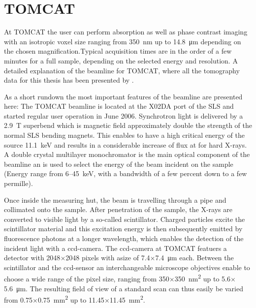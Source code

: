 \section{TOMCAT}
At \acf{TOMCAT} the user can perform absorption as well as phase contrast imaging with an isotropic voxel size ranging from \SI{350}{\nano\meter} up to \SI{14.8}{\micro\meter} depending on the chosen magnification.Typical acquisition times are in the order of a few minutes for a full sample, depending on the selected energy and resolution. A detailed explanation of the beamline for \ac{TOMCAT}, where all the tomography data for this thesis has been presented by \citet{Stampanoni2006a}.

As a short rundown the most important features of the beamline are presented here: The \ac{TOMCAT} beamline is located at the X02DA port of the SLS and started regular user operation in June 2006. Synchrotron light is delivered by a \SI{2.9}{\tesla} superbend which is magnetic field approximately double the strength of the normal \ac{SLS} bending magnets. This enables to have a high critical energy of the source \SI{11.1}{\kilo\electronvolt} and results in a considerable increase of flux at for hard X-rays. A double crystal multilayer monochromator is the main optical component of the beamline an is used to select the energy of the beam incident on the sample (Energy range from 6--\SI{45}{\kilo\electronvolt}, with a bandwidth of a few percent down to a few permille).

Once inside the measuring hut, the beam is travelling through a pipe and collimated onto the sample. After penetration of the sample, the X-rays are converted to visible light by a so-called scintillator. Charged particles excite the scintillator material and this excitation energy is then subsequently emitted by fluorescence photons at a longer wavelength, which enables the detection of the incident light with a \ac{ccd}-camera. The \ac{ccd}-camera at \ac{TOMCAT} featuers a detector with 2048$\times$2048 pixels with asize of 7.4$\times$\SI{7.4}{\micro\meter} each. Between the scintillator and the \ac{ccd}-sensor an interchangeable microscope objectives enable to choose a wide range of the pixel size, ranging from 350$\times$\SI{350}{\nano\meter\squared} up to 5.6$\times$\SI{5.6}{\micro\meter}. The resulting field of view of a standard scan can thus easily be varied from 0.75$\times$\SI{0.75}{\milli\meter\squared} up to 11.45$\times$\SI{11.45}{\milli\meter\squared}.

